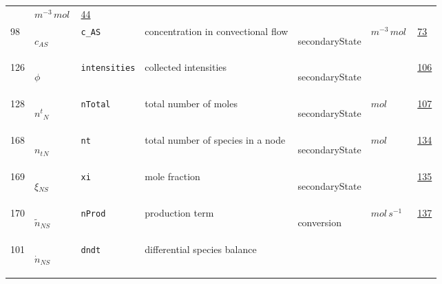 \begin{longtable}{|p{1cm}|p{2.5cm}|p{4.5cm}|p{8cm}|p{3.0cm}|p{3cm}|p{1cm}|}
             & $ m^{-3} \,mol \, $
             & \hyperlink{"e:44"}{ 44 }
                 \\
    98
             & \hypertarget{"v:98"}{ $ {c}{_{{A S}}} $}
             & \verb|c_AS|
             & concentration in convectional flow
             & \begin{lay}secondaryState \end{lay}
             & $ m^{-3} \,mol \, $
             & \hyperlink{"e:73"}{ 73 }
                 \\
    126
             & \hypertarget{"v:126"}{ $ {\phi}{_{}} $}
             & \verb|intensities|
             & collected intensities
             & \begin{lay}secondaryState \end{lay}
             & $  $
             & \hyperlink{"e:106"}{ 106 }
                 \\
    128
             & \hypertarget{"v:128"}{ $ {{n^t}}{_{N}} $}
             & \verb|nTotal|
             & total number of moles
             & \begin{lay}secondaryState \end{lay}
             & $ mol \, $
             & \hyperlink{"e:107"}{ 107 }
                 \\
    168
             & \hypertarget{"v:168"}{ $ {n_t}{_{N}} $}
             & \verb|nt|
             & total number of species in a node
             & \begin{lay}secondaryState \end{lay}
             & $ mol \, $
             & \hyperlink{"e:134"}{ 134 }
                 \\
    169
             & \hypertarget{"v:169"}{ $ {\xi}{_{{N S}}} $}
             & \verb|xi|
             & mole fraction
             & \begin{lay}secondaryState \end{lay}
             & $  $
             & \hyperlink{"e:135"}{ 135 }
                 \\
    170
             & \hypertarget{"v:170"}{ $ {{\tilde n}}{_{{N S}}} $}
             & \verb|nProd|
             & production term
             & \begin{lay}conversion \end{lay}
             & $ mol \,s^{-1} \, $
             & \hyperlink{"e:137"}{ 137 }
                 \\
    101
             & \hypertarget{"v:101"}{ $ {\dot{n}}{_{{N S}}} $}
             & \verb|dndt|
             & differential species balance

\end{longtable}
